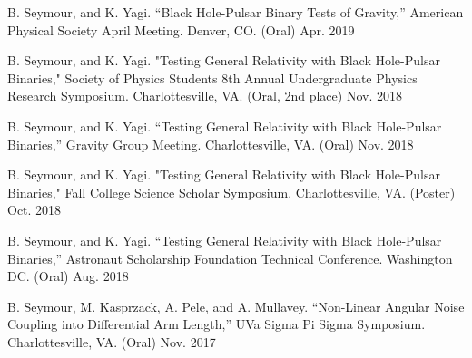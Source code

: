 

\begin{cvpresentations}



    \cvpresentation
    {B. Seymour, and K. Yagi. “Black Hole-Pulsar Binary Tests of Gravity,” American Physical Society April Meeting. Denver, CO. (Oral)}
    {Apr. 2019}
    
  \cvpresentation
    {B. Seymour, and K. Yagi. "Testing General Relativity with Black Hole-Pulsar Binaries," Society of Physics Students 8th Annual Undergraduate Physics Research Symposium. Charlottesville, VA. (Oral, 2nd place)} %
    {Nov. 2018 } %
    
  \cvpresentation
    {B. Seymour, and K. Yagi. “Testing General Relativity with Black Hole-Pulsar Binaries,” Gravity Group Meeting. Charlottesville, VA. (Oral)} %
    {Nov. 2018} %
    

  \cvpresentation
    {B. Seymour, and K. Yagi. "Testing General Relativity with Black Hole-Pulsar Binaries," Fall College Science Scholar Symposium. Charlottesville, VA. (Poster)} %
    {Oct. 2018} %



  \cvpresentation
    {B. Seymour, and K. Yagi. “Testing General Relativity with Black Hole-Pulsar Binaries,” Astronaut Scholarship Foundation Technical Conference. Washington DC. (Oral)} %
    {Aug. 2018} %



  \cvpresentation
    {B. Seymour, M. Kasprzack, A. Pele, and A. Mullavey. “Non-Linear Angular Noise Coupling into Differential Arm Length,” UVa Sigma Pi Sigma Symposium. Charlottesville, VA. (Oral)} %
    {Nov. 2017} %




\end{cvpresentations}
